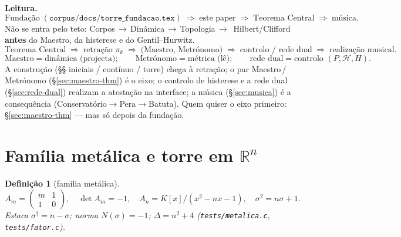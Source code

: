 \documentclass[11pt,a4paper]{article}
\newtheorem{definicao}{Definição}
\newcommand{\code}[1]{\texttt{#1}}
\begin{document}
\begin{abstract}
\emph{Corpo Algébrico} (este corpo é instância): lido pelo endereço,
$e=R-k=0$ exato, e o teto dimensional existe.
A \textbf{leitura complexa} (\S\ref{sec:pares-complexos})
formaliza o par $(R,I)$, deriva Euler (\S\ref{sec:euler-peano}),
e põe o \textbf{Metrónomo entre} as visões cartesiana e polar
(\S\ref{sec:metronomo-ponte}) --- mede o tick nas duas cartas; depois
a forma polar e a releitura de Lyapunov
(\S\ref{sec:lyap-dual-releitura}). Só então a \textbf{rede neural
dual} (\S\ref{sec:rede-dual}): Teoremas~\ref{thm:retencao-neural},
\ref{thm:rede-dual}; pesos $W=-I$ pela Lei~1; Hopfield $=$ memória da
volta, não inversão --- $\lambda^{+}+\lambda^{-}=0$ pela dualidade
reversível (Teorema~\ref{thm:metronomo}). Verificação:
\code{tests/corpo\_topologico.c} §CP1--§CP40;
\code{tools/bench\_histerese.sh};
\code{tools/bench\_vizinhanca.sh};
\code{papers/arquitetura.tex}.
\end{abstract}

\medskip
\noindent\textbf{Leitura.}
\[
\boxed{
\text{Fundação}
\;(\code{corpus/docs/torre\_fundacao.tex})
\;\Longrightarrow\;
\text{este paper}
\;\Longrightarrow\;
\text{Teorema Central}
\;\Longrightarrow\;
\text{música}.
}
\]
Não se entra pelo teto: Corpos\,$\to$\,Dinâmica\,$\to$\,Topologia\,$\to$\,
Hilbert/Clifford \textbf{antes} do Maestro, da histerese e do Gentil--Hurwitz.
\[
\boxed{
\text{Teorema Central}
\;\Longrightarrow\;
\text{retração }\pi_k
\;\Longrightarrow\;
\bigl(\text{Maestro},\,\text{Metrónomo}\bigr)
\;\Longrightarrow\;
\text{controlo / rede dual}
\;\Longrightarrow\;
\text{realização musical}.
}
\]
\[
\boxed{
\text{Maestro}=\text{dinâmica (projecta)};
\qquad
\text{Metrónomo}=\text{métrica (lê)};
\qquad
\text{rede dual}=\text{controlo }(P,\mathcal{H},H).
}
\]
A construção (§§ iniciais / contínuo / torre) chega à retração; o
par Maestro\,/\,Metrónomo (\S\ref{sec:maestro-thm}) é o eixo; o
controlo de histerese e a rede dual (\S\ref{sec:rede-dual}) realizam
a atestação na interface; a música
(\S\ref{sec:musica}) é a consequência
(Conservatório$\to$Pera$\to$Batuta). Quem quiser o eixo primeiro:
\S\ref{sec:maestro-thm} --- mas só depois da fundação.
\section{Família metálica e torre em $\mathbb{R}^{n}$}

\begin{definicao}[família metálica]\label{def:metal}
\[
A_m=\begin{pmatrix}m&1\\1&0\end{pmatrix},
\quad\det A_m=-1,
\quad
A_n=K[x]/(x^{2}-nx-1),
\quad
\sigma^{2}=n\sigma+1.
\]
Estaca $\sigma^{\dagger}=n-\sigma$; norma $N(\sigma)=-1$;
$\Delta=n^{2}+4$ (\code{tests/metalica.c}, \code{tests/fator.c}).
\end{definicao}
\end{document}
